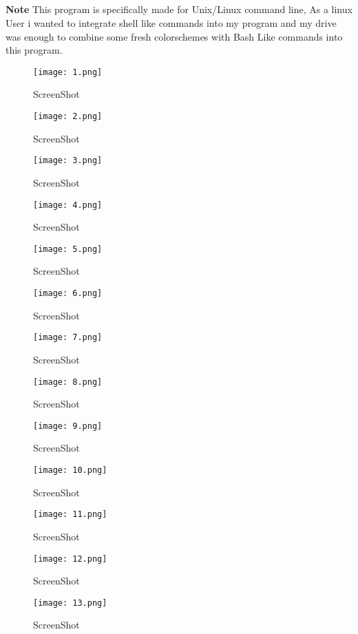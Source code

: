 \documentclass[
	12pt, %
]{fphw}
\newenvironment{formal}{
 \def\FrameCommand{{\color{YellowOrange}\vrule width 2pt}\hspace{2pt}}
 \MakeFramed{\advance\hsize-\width}
 \vspace{2pt}\noindent\hspace{-7pt}\vspace{3pt}
}{\vspace{3pt}\endMakeFramed}
\begin{document}
\subsection*{}

 \begin{formal}
 {\bf Note}
	This program is specifically made for Unix/Linux command line, As a linux User i wanted to integrate shell like commands into my
	 program and my drive was enough to combine some fresh colorschemes with Bash Like commands into this program.\\
 \end{formal}
\begin{figure}[!htb]
  \texttt{[image: 1.png]}
  \caption{ScreenShot}
\end{figure}
\begin{figure}[!htb]
  \texttt{[image: 2.png]}
  \caption{ScreenShot}
\end{figure}
\begin{figure}[!htb]
  \texttt{[image: 3.png]}
  \caption{ScreenShot}
\end{figure}
\begin{figure}[!htb]
  \texttt{[image: 4.png]}
  \caption{ScreenShot}
\end{figure}
\begin{figure}[!htb]
  \texttt{[image: 5.png]}
  \caption{ScreenShot}
\end{figure}
\begin{figure}[!htb]
  \texttt{[image: 6.png]}
  \caption{ScreenShot}
\end{figure}
\begin{figure}[!htb]
  \texttt{[image: 7.png]}
  \caption{ScreenShot}
\end{figure}
\begin{figure}[!htb]
  \texttt{[image: 8.png]}
  \caption{ScreenShot}
\end{figure}
\begin{figure}[!htb]
  \texttt{[image: 9.png]}
  \caption{ScreenShot}
\end{figure}
\begin{figure}[!htb]
  \texttt{[image: 10.png]}
  \caption{ScreenShot}
\end{figure}
\begin{figure}[!htb]
  \texttt{[image: 11.png]}
  \caption{ScreenShot}
\end{figure}
\begin{figure}[!htb]
  \texttt{[image: 12.png]}
  \caption{ScreenShot}
\end{figure}
\begin{figure}[!htb]
  \texttt{[image: 13.png]}
  \caption{ScreenShot}
\end{figure}
\clearpage
\end{document}
